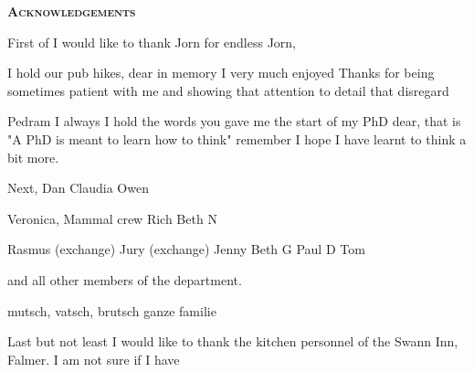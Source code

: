 \pagestyle{empty}%
\begin{center}
	\Huge \textsc{\textbf{Acknowledgements}}
	\hrulefill
\end{center}

First of I would like to thank Jorn for endless Jorn, 

I hold our pub hikes, dear in memory
I very much enjoyed 
Thanks for being sometimes patient with me and showing that attention to detail that disregard

Pedram
I always
I hold the words you gave me the start of my PhD dear, that is "A PhD is meant to learn how to think"
remember 
I hope I have learnt to think a bit more.

Next, 
Dan
Claudia
Owen

Veronica, Mammal crew
Rich
Beth N

Rasmus (exchange)
Jury (exchange)
Jenny
Beth G
Paul D
Tom

and all other members of the department.

mutsch, vatsch, brutsch
ganze familie

Last but not least I would like to thank the kitchen personnel of the Swann Inn, Falmer. 
I am not sure if I have 